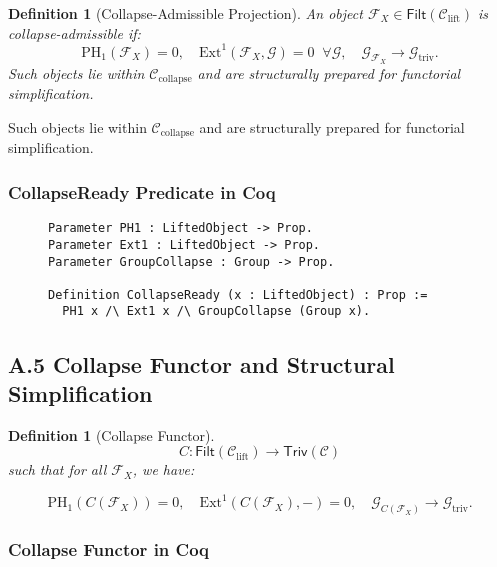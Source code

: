 \documentclass[11pt]{article}
\newtheorem{definition}[theorem]{Definition}
\begin{document}
\begin{definition}[Collapse-Admissible Projection]
An object \( \mathcal{F}_X \in \mathsf{Filt}(\mathcal{C}_{\mathrm{lift}}) \) is \emph{collapse-admissible} if:
\[
\mathrm{PH}_1(\mathcal{F}_X) = 0, \quad \mathrm{Ext}^1(\mathcal{F}_X, \mathcal{G}) = 0 \;\; \forall \mathcal{G}, \quad \mathcal{G}_{\mathcal{F}_X} \longrightarrow \mathcal{G}_{\mathrm{triv}}.
\]
Such objects lie within \( \mathcal{C}_{\mathrm{collapse}} \) and are structurally prepared for functorial simplification.
\end{definition}


Such objects lie within \( \mathcal{C}_{\mathrm{collapse}} \) and are structurally prepared for functorial simplification.

\subsubsection*{CollapseReady Predicate in Coq}

\begin{figure}[h]
\centering
\begin{lstlisting}[language=Coq, caption=Collapse-Readiness Predicate]
Parameter PH1 : LiftedObject -> Prop.
Parameter Ext1 : LiftedObject -> Prop.
Parameter GroupCollapse : Group -> Prop.

Definition CollapseReady (x : LiftedObject) : Prop :=
  PH1 x /\ Ext1 x /\ GroupCollapse (Group x).
\end{lstlisting}
\end{figure}

\subsection*{A.5 Collapse Functor and Structural Simplification}

\begin{definition}[Collapse Functor]
\[
C : \mathsf{Filt}(\mathcal{C}_{\mathrm{lift}}) \longrightarrow \mathsf{Triv}(\mathcal{C})
\]
such that for all \( \mathcal{F}_X \), we have:

\[
\mathrm{PH}_1(C(\mathcal{F}_X)) = 0, \quad \mathrm{Ext}^1(C(\mathcal{F}_X), -) = 0, \quad \mathcal{G}_{C(\mathcal{F}_X)} \longrightarrow \mathcal{G}_{\mathrm{triv}}.
\]
\end{definition}


\subsubsection*{Collapse Functor in Coq}
\end{document}
